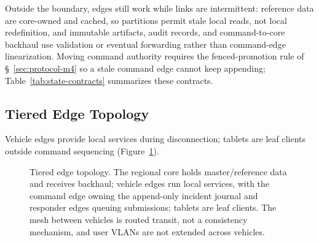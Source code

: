 Outside the boundary, edges still work while links are intermittent: reference
data are core-owned and cached, so partitions permit stale local reads, not local
redefinition, and immutable artifacts, audit records, and command-to-core backhaul
use validation or eventual forwarding rather than command-edge linearization.
Moving command authority requires the fenced-promotion rule of
\S~\ref{sec:protocol-m4} so a stale command edge cannot keep appending;
Table~\ref{tab:state-contracts} summarizes these contracts.


\begin{table}[t]
\centering
\caption{Only authority-bearing journal entries use the single-writer contract; other incident state uses local or eventual synchronization contracts.}
\label{tab:state-contracts}

\end{table}

\subsection{Tiered Edge Topology}

Vehicle edges provide local services during disconnection; tablets are leaf
clients outside command sequencing (Figure~\ref{fig:tiered-topology}).

\begin{figure}[t]
\centering
\resizebox{\columnwidth}{!}{}
\caption{Tiered edge topology. The regional core holds master/reference data and
receives backhaul; vehicle edges run local services, with the command edge owning
the append-only incident journal and responder edges queuing submissions; tablets
are leaf clients. The mesh between vehicles is routed transit, not a consistency
mechanism, and user VLANs are not extended across vehicles.}
\label{fig:tiered-topology}
\end{figure}

